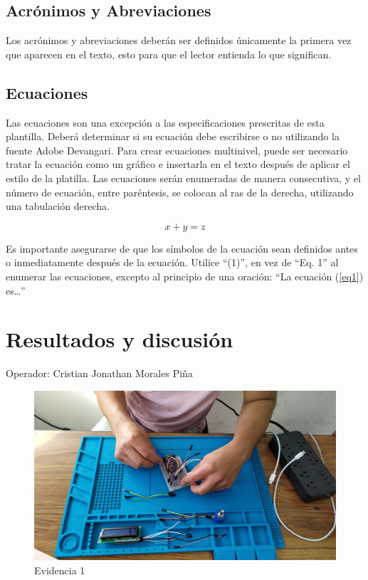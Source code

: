     \subsection{Acrónimos y Abreviaciones}
    
    Los acrónimos y abreviaciones deberán ser definidos únicamente la primera vez que aparecen en el texto, esto para que el lector entienda lo que significan.
    
    \subsection{Ecuaciones}
    
    Las ecuaciones son una excepción a las especificaciones prescritas de esta plantilla. 
    Deberá determinar si su ecuación debe escribirse o no utilizando la fuente Adobe Devangari. 
    Para crear ecuaciones multinivel, puede ser necesario tratar la ecuación como un gráfico e insertarla en el texto después de aplicar el estilo de la platilla.
    Las ecuaciones serán enumeradas de manera consecutiva, y el número de ecuación, entre paréntesis, se colocan al ras de la derecha, utilizando una tabulación derecha. 
    
    \begin{equation}
        \label{eq1}
        x + y = z 
    \end{equation}
    
    Es importante asegurarse de que los símbolos de la ecuación sean definidos antes o inmediatamente después de la ecuación. Utilice “(1)”, en vez de “Eq. 1” al enumerar las ecuaciones, excepto al principio de una oración: “La ecuación (\ref{eq1}) es…”
    
    \section{Resultados y discusión}
    
    
    
    Operador: Cristian Jonathan Morales Piña
    
    
    
    \begin{figure}
        \centering
        \includegraphics[trim = {60mm 40mm 80mm 60mm},clip,scale=0.2]{35/Img/ensamble1.jpeg}
        \caption{Evidencia 1}
        \label{Evidencia 1}
    \end{figure}
    
